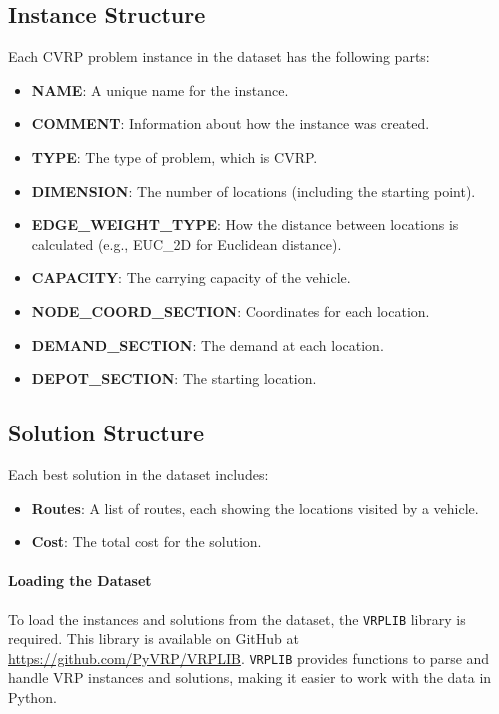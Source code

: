 \documentclass[
]{article}
\begin{document}
    \subsection{Instance Structure}
    Each CVRP problem instance in the dataset has the following parts:
    \begin{itemize}
        \item \textbf{NAME}: A unique name for the instance.
        \item \textbf{COMMENT}: Information about how the instance was created.
        \item \textbf{TYPE}: The type of problem, which is CVRP.
        \item \textbf{DIMENSION}: The number of locations (including the starting point).
        \item \textbf{EDGE\_WEIGHT\_TYPE}: How the distance between locations is calculated (e.g., EUC\_2D for Euclidean distance).
        \item \textbf{CAPACITY}: The carrying capacity of the vehicle.
        \item \textbf{NODE\_COORD\_SECTION}: Coordinates for each location.
        \item \textbf{DEMAND\_SECTION}: The demand at each location.
        \item \textbf{DEPOT\_SECTION}: The starting location.
    \end{itemize}

    \subsection{Solution Structure}
    Each best solution in the dataset includes:
    \begin{itemize}
        \item \textbf{Routes}: A list of routes, each showing the locations visited by a vehicle.
        \item \textbf{Cost}: The total cost for the solution.
    \end{itemize}

    \paragraph{Loading the Dataset}
    To load the instances and solutions from the dataset, the \texttt{VRPLIB} library is required.
    This library is available on GitHub at \url{https://github.com/PyVRP/VRPLIB}.
    \texttt{VRPLIB} provides functions to parse and handle VRP instances and solutions, making it easier to work with the data in Python.
\end{document}
